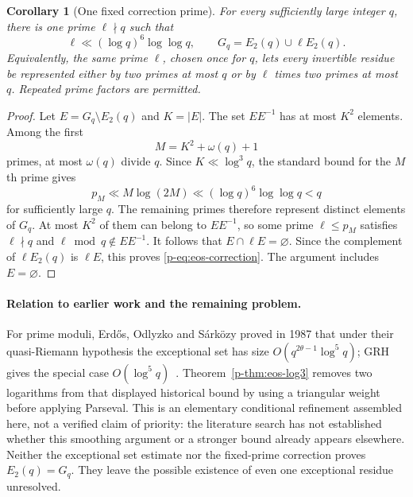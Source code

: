 \documentclass[11pt,a4paper]{article}
\newtheorem{corollary}[theorem]{Corollary}
\theoremstyle{definition}
\theoremstyle{remark}
\begin{document}
\begin{corollary}[One fixed correction prime]\label{p-cor:eos-correction}
For every sufficiently large integer $q$, there is one prime
$\ell\nmid q$ such that
\begin{equation}\label{p-eq:eos-correction}
 \ell\ll(\log q)^6\log\log q,
 \qquad
 G_q=E_2(q)\cup\ell E_2(q).
\end{equation}
Equivalently, the same prime $\ell$, chosen once for $q$, lets every
invertible residue be represented either by two primes at most $q$
or by $\ell$ times two primes at most $q$. Repeated prime factors
are permitted.
\end{corollary}

\begin{proof}
Let $E=G_q\setminus E_2(q)$ and $K=|E|$.
The set $EE^{-1}$ has at most $K^2$ elements. Among the first
\[
 M=K^2+\omega(q)+1
\]
primes, at most $\omega(q)$ divide $q$. Since $K\ll\log^3q$,
the standard bound for the $M$th prime gives
\[
 p_M\ll M\log(2M)\ll(\log q)^6\log\log q<q
\]
for sufficiently large $q$. The remaining primes therefore represent
distinct elements of $G_q$. At most $K^2$ of them can belong to
$EE^{-1}$, so some prime $\ell\leq p_M$ satisfies
$\ell\nmid q$ and $\ell\bmod q\notin EE^{-1}$.
It follows that $E\cap\ell E=\varnothing$. Since the complement of
$\ell E_2(q)$ is $\ell E$, this proves \eqref{p-eq:eos-correction}.
The argument includes $E=\varnothing$.
\end{proof}

\paragraph{Relation to earlier work and the remaining problem.}
For prime moduli, Erd\H{o}s, Odlyzko and S\'ark\"ozy proved in
1987 that under their quasi-Riemann hypothesis the exceptional set
has size $O(q^{2\theta-1}\log^5q)$; GRH gives the special case
$O(\log^5q)$~\cite{p-EOS1987}. Theorem~\ref{p-thm:eos-log3} removes two
logarithms from that displayed historical bound by using a triangular
weight before applying Parseval. This is an elementary conditional
refinement assembled here, not a verified claim of priority: the
literature search has not established whether this smoothing argument
or a stronger bound already appears elsewhere. Neither the exceptional
set estimate nor the fixed-prime correction proves $E_2(q)=G_q$.
They leave the possible existence of even one exceptional residue
unresolved.
\end{document}
